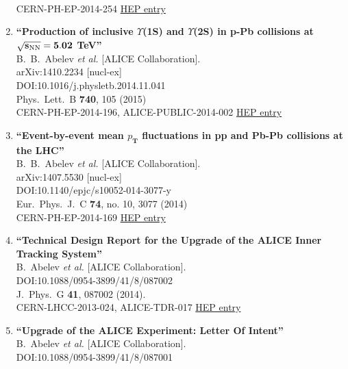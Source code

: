 \begin{enumerate}
  \\{}CERN-PH-EP-2014-254
\href{http://inspirehep.net/record/1328629}{HEP entry}
\item%
{\bf ``Production of inclusive $\Upsilon$(1S) and $\Upsilon$(2S) in p-Pb collisions at $\mathbf{\sqrt{s_{{\rm NN}}} = 5.02}$ TeV''}
  \\{}B.~B.~Abelev {\it et al.} [ALICE Collaboration].
  \\{}arXiv:1410.2234 [nucl-ex]
  \\{}DOI:10.1016/j.physletb.2014.11.041
  \\{}Phys.\ Lett.\ B {\bf 740}, 105 (2015)
  \\{}CERN-PH-EP-2014-196, ALICE-PUBLIC-2014-002
\href{http://inspirehep.net/record/1321022}{HEP entry}
\item%
{\bf ``Event-by-event mean ${p}_{\mathbf {T}}$ fluctuations in pp and Pb-Pb collisions at the LHC''}
  \\{}B.~B.~Abelev {\it et al.} [ALICE Collaboration].
  \\{}arXiv:1407.5530 [nucl-ex]
  \\{}DOI:10.1140/epjc/s10052-014-3077-y
  \\{}Eur.\ Phys.\ J.\ C {\bf 74}, no. 10, 3077 (2014)
  \\{}CERN-PH-EP-2014-169
\href{http://inspirehep.net/record/1307102}{HEP entry}
\item%
{\bf ``Technical Design Report for the Upgrade of the ALICE Inner Tracking System''}
  \\{}B.~Abelev {\it et al.} [ALICE Collaboration].
  \\{}DOI:10.1088/0954-3899/41/8/087002
  \\{}J.\ Phys.\ G {\bf 41}, 087002 (2014).
  \\{}CERN-LHCC-2013-024, ALICE-TDR-017
\href{http://inspirehep.net/record/1305021}{HEP entry}
\item%
{\bf ``Upgrade of the ALICE Experiment: Letter Of Intent''}
  \\{}B.~Abelev {\it et al.} [ALICE Collaboration].
  \\{}DOI:10.1088/0954-3899/41/8/087001

\end{enumerate}
